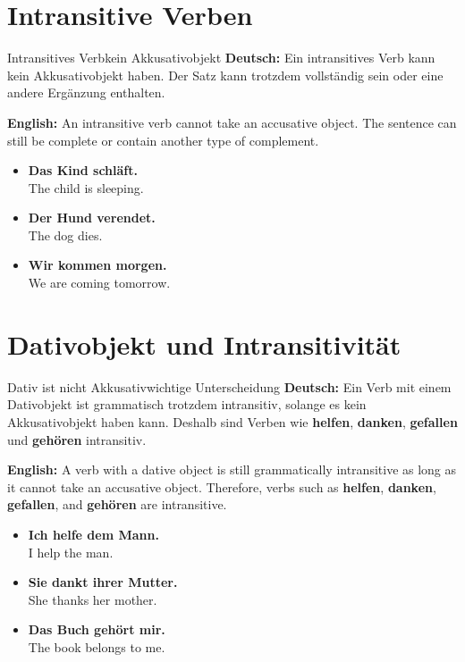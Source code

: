 \documentclass[a4paper,11pt]{article}
\newcommand{\GermanText}[1]{\textbf{Deutsch: }#1\par}
\newcommand{\EnglishText}[1]{{\small\color{SoftGray}\textbf{English: }#1\par}}
\newcommand{\ExampleItem}[2]{\item \textbf{#1}\\{\small\color{SoftGray}#2}}
\begin{document}
    
    \section{Intransitive Verben}
        
        \begin{grammarentry}{Intransitives Verb}{kein Akkusativobjekt}
            \GermanText{Ein intransitives Verb kann kein Akkusativobjekt haben. Der Satz kann trotzdem vollständig sein oder eine andere Ergänzung enthalten.}
            \EnglishText{An intransitive verb cannot take an accusative object. The sentence can still be complete or contain another type of complement.}
        \end{grammarentry}
        
        \begin{exbox}
            \begin{itemize}
                \ExampleItem{Das Kind schläft.}{The child is sleeping.}
                \ExampleItem{Der Hund verendet.}{The dog dies.}
                \ExampleItem{Wir kommen morgen.}{We are coming tomorrow.}
            \end{itemize}
        \end{exbox}
    
    
    \section{Dativobjekt und Intransitivität}
        
        \begin{grammarentry}{Dativ ist nicht Akkusativ}{wichtige Unterscheidung}
            \GermanText{Ein Verb mit einem Dativobjekt ist grammatisch trotzdem intransitiv, solange es kein Akkusativobjekt haben kann. Deshalb sind Verben wie \textbf{helfen}, \textbf{danken}, \textbf{gefallen} und \textbf{gehören} intransitiv.}
            \EnglishText{A verb with a dative object is still grammatically intransitive as long as it cannot take an accusative object. Therefore, verbs such as \textbf{helfen}, \textbf{danken}, \textbf{gefallen}, and \textbf{gehören} are intransitive.}
        \end{grammarentry}
        
        \begin{exbox}
            \begin{itemize}
                \ExampleItem{Ich helfe dem Mann.}{I help the man.}
                \ExampleItem{Sie dankt ihrer Mutter.}{She thanks her mother.}
                \ExampleItem{Das Buch gehört mir.}{The book belongs to me.}
            \end{itemize}
        \end{exbox}
    
\end{document}
